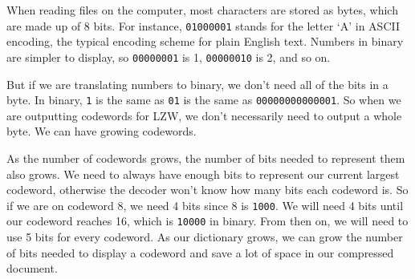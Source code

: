 \documentclass[12pt,twoside]{reedthesis}
\begin{document}
When reading files on the computer, most characters are stored as bytes, which are made up of 8 bits. For instance, \texttt{01000001} stands for the letter `A' in ASCII encoding, the typical encoding scheme for plain English text. Numbers in binary are simpler to display, so \texttt{00000001} is 1, \texttt{00000010} is 2, and so on.

But if we are translating numbers to binary, we don't need all of the bits in a byte. In binary, \texttt{1} is the same as \texttt{01} is the same as \texttt{00000000000001}. So when we are outputting codewords for LZW, we don't necessarily need to output a whole byte. We can have growing codewords.

As the number of codewords grows, the number of bits needed to represent them also grows. We need to always have enough bits to represent our current largest codeword, otherwise the decoder won't know how many bits each codeword is. So if we are on codeword 8, we need 4 bits since 8 is \texttt{1000}. We will need 4 bits until our codeword reaches 16, which is \texttt{10000} in binary. From then on, we will need to use 5 bits for every codeword. As our dictionary grows, we can grow the number of bits needed to display a codeword and save a lot of space in our compressed document.
\end{document}
